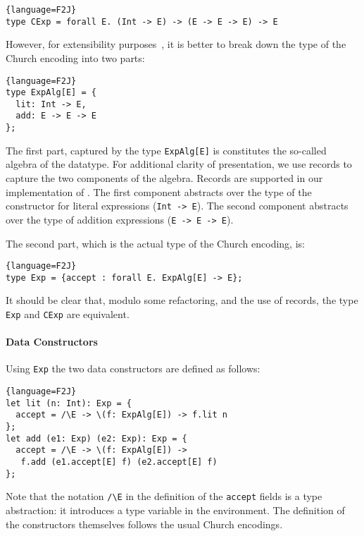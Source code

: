\begin{lstlisting}{language=F2J}
type CExp = forall E. (Int -> E) -> (E -> E -> E) -> E
\end{lstlisting}

\noindent However, for extensibility purposes~\cite{}, it is better to break
down the type of the Church encoding into two parts:

\begin{lstlisting}{language=F2J}
type ExpAlg[E] = {
  lit: Int -> E,
  add: E -> E -> E
};
\end{lstlisting}

\noindent The first part, captured by the type \lstinline{ExpAlg[E]}
is constitutes the so-called algebra of the datatype. For additional
clarity of presentation, we use records to capture the two components
of the algebra. Records are supported in our implementation of \name.
The first component abstracts over the type of the
constructor for literal expressions (\lstinline{Int -> E}). The second
component abstracts over the type of addition expressions
(\lstinline{E -> E -> E}).

The second part, which is the actual type of the Church encoding, is:

\begin{lstlisting}{language=F2J}
type Exp = {accept : forall E. ExpAlg[E] -> E};
\end{lstlisting}

\noindent It should be clear that, modulo some refactoring, and the
use of records, the type \lstinline{Exp} and \lstinline{CExp}
are equivalent. 

\paragraph{Data Constructors}
Using \lstinline{Exp} the two data constructors are defined as follows:

\begin{lstlisting}{language=F2J}
let lit (n: Int): Exp = {
  accept = /\E -> \(f: ExpAlg[E]) -> f.lit n
};
let add (e1: Exp) (e2: Exp): Exp = {
  accept = /\E -> \(f: ExpAlg[E]) ->
   f.add (e1.accept[E] f) (e2.accept[E] f)
};
\end{lstlisting}

Note that the notation \lstinline{/\E} in the definition of the
\lstinline{accept} fields is a type abstraction: it
introduces a type variable in the environment. The definition of the
constructors themselves follows the usual Church encodings.

